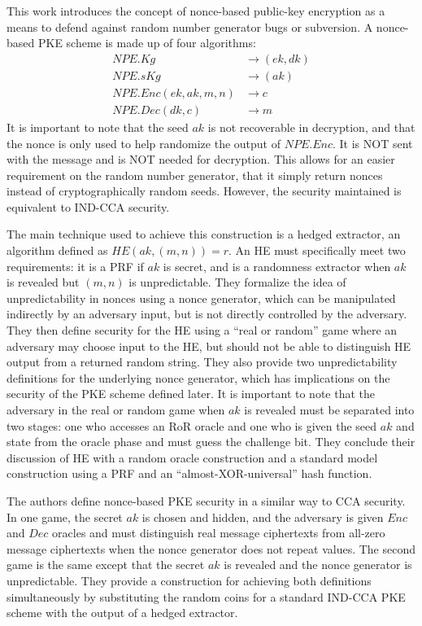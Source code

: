 \documentclass[11pt, pdftex]{article}
\begin{document}
This work introduces the concept of nonce-based public-key encryption as a means to defend against random number generator bugs or
subversion.  A nonce-based PKE scheme is made up of four algorithms:
\begin{align*}
NPE.Kg &\rightarrow (ek,dk)\\
NPE.sKg &\rightarrow (ak)\\
NPE.Enc(ek, ak, m, n) &\rightarrow c\\
NPE.Dec(dk, c) &\rightarrow m
\end{align*}
It is important to note that the seed $ak$ is not recoverable in decryption, and that the nonce is only used to help randomize the output
of $NPE.Enc$.  It is NOT sent with the message and is NOT needed for decryption.  This allows for an easier requirement on the random
number generator, that it simply return nonces instead of cryptographically random seeds.  However, the security maintained is equivalent to
IND-CCA security.

The main technique used to achieve this construction is a hedged extractor, an algorithm defined as $HE(ak, (m,n)) = r$.  An HE must specifically
meet two requirements: it is a PRF if $ak$ is secret, and is a randomness extractor when $ak$ is revealed but $(m,n)$ is unpredictable.  They formalize
the idea of unpredictability in nonces using a nonce generator, which can be manipulated indirectly by an adversary input, but is not directly controlled
by the adversary.  They then define security for the HE using a ``real or random'' game where an adversary may choose input to the HE,
but should not be able to distinguish HE output from a returned random string.  They also provide two unpredictability definitions for the underlying
nonce generator, which has implications on the security of the PKE scheme defined later.  It is important to note that the adversary in the
real or random game when $ak$ is revealed must be separated into two stages: one who accesses an RoR oracle and one who 
is given the seed $ak$ and state from the oracle phase and must guess the challenge bit.  They conclude their discussion of HE with a random oracle
construction and a standard model construction using a PRF and an ``almost-XOR-universal'' hash function.

The authors define nonce-based PKE security in a similar way to CCA security.  In one game, the secret $ak$ is chosen and hidden, and the
adversary is given $Enc$ and $Dec$ oracles and must distinguish real message ciphertexts from all-zero message ciphertexts when the nonce generator
does not repeat values.  The second game
is the same except that the secret $ak$ is revealed and the nonce generator is unpredictable.  
They provide a construction for achieving both definitions simultaneously by substituting the
random coins for a standard IND-CCA PKE scheme with the output of a hedged extractor.
\end{document}
